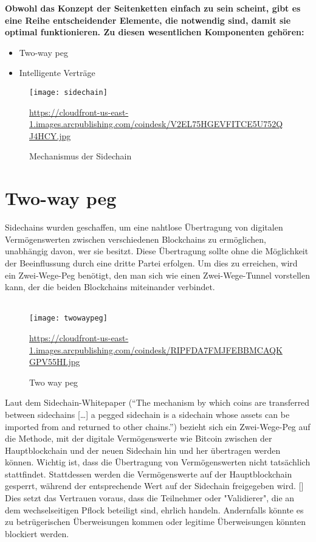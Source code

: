 \documentclass[ngerman]{scrreprt}
\begin{document}
\textbf{Obwohl das Konzept der Seitenketten einfach zu sein scheint, gibt es eine Reihe entscheidender Elemente, die notwendig sind, damit sie optimal funktionieren. Zu diesen wesentlichen Komponenten gehören:}

\begin{itemize}
	\item Two-way peg
	\item Intelligente Verträge
\end{itemize}


\begin{figure}[H]
	\texttt{[image: sidechain]}
	\caption{Mechanismus der Sidechain}
	\small{\url{https://cloudfront-us-east-1.images.arcpublishing.com/coindesk/V2EL75HGEVFITCE5U752QJ4HCY.jpg}}
\end{figure}

\section{Two-way peg}
Sidechains wurden geschaffen, um eine nahtlose Übertragung von digitalen Vermögenswerten zwischen verschiedenen Blockchains zu ermöglichen, unabhängig davon, wer sie besitzt. Diese Übertragung sollte ohne die Möglichkeit der Beeinflussung durch eine dritte Partei erfolgen. Um dies zu erreichen, wird ein Zwei-Wege-Peg benötigt, den man sich wie einen Zwei-Wege-Tunnel vorstellen kann, der die beiden Blockchains miteinander verbindet. \\ \\

\begin{figure}[H]
	\texttt{[image: twowaypeg]}
	\caption{Two way peg}
	\small{\url{https://cloudfront-us-east-1.images.arcpublishing.com/coindesk/RIPFDA7FMJFEBBMCAQKGPV55HI.jpg}}
\end{figure}

Laut dem Sidechain-Whitepaper (“The mechanism by which coins are transferred between sidechains […] a pegged sidechain is a sidechain whose assets can be imported from and returned to other chains.”) bezieht sich ein Zwei-Wege-Peg auf die Methode, mit der digitale Vermögenswerte wie Bitcoin zwischen der Hauptblockchain und der neuen Sidechain hin und her übertragen werden können. Wichtig ist, dass die Übertragung von Vermögenswerten nicht tatsächlich stattfindet. Stattdessen werden die Vermögenswerte auf der Hauptblockchain gesperrt, während der entsprechende Wert auf der Sidechain freigegeben wird. [\cite{coin_desk}] \\ 
Dies setzt das Vertrauen voraus, dass die Teilnehmer oder "Validierer", die an dem wechselseitigen Pflock beteiligt sind, ehrlich handeln. Andernfalls könnte es zu betrügerischen Überweisungen kommen oder legitime Überweisungen könnten blockiert werden.
\end{document}
